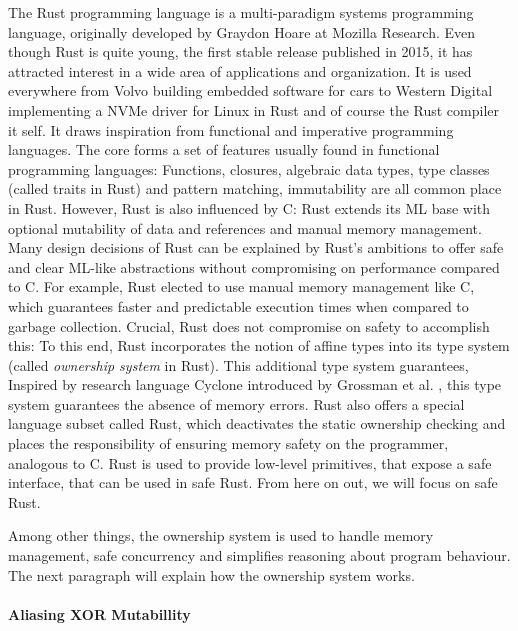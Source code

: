 \documentclass[twoside, english]{sdqthesis}
\theoremstyle{definition}
\begin{document}
The Rust programming language \cite{matsakis_rust_2014} is a multi-paradigm systems programming language, originally developed by Graydon Hoare at Mozilla Research.
Even though Rust is quite young, the first stable release published in 2015, it has attracted interest in a wide area of applications and organization. It is used everywhere from Volvo building embedded software for cars \cite{foufas_why_2022} to Western Digital implementing a NVMe driver for Linux in Rust \cite{larabel_lpc_2022} and of course the Rust compiler it self.
It draws inspiration from functional and imperative programming languages. The core forms a set of features usually found in functional programming languages: Functions, closures, algebraic data types, type classes (called traits in Rust) and pattern matching, immutability are all common place in Rust.
However, Rust is also influenced by C: Rust extends its ML base with optional mutability of data and references and manual memory management. Many design decisions of Rust can be explained by Rust's ambitions to offer safe and clear ML-like abstractions without compromising on performance compared to C.
For example, Rust elected to use manual memory management like C, which guarantees faster and predictable execution times when compared to garbage collection. Crucial, Rust does not compromise on safety to accomplish this: To this end, Rust incorporates the notion of affine types into its type system (called \textit{ownership system} in Rust). This additional type system guarantees, 
Inspired by research language Cyclone introduced by Grossman et al. \cite{grossman_region-based_nodate}, this type system guarantees the absence of memory errors.
Rust also offers a special language subset called  Rust, which deactivates the static ownership checking and places the responsibility of ensuring memory safety on the programmer, analogous to C.  Rust is used to provide low-level primitives, that expose a safe interface, that can be used in safe Rust. From here on out, we will focus on safe Rust.

Among other things, the ownership system is used to handle memory management, safe concurrency and simplifies reasoning about program behaviour.
The next paragraph will explain how the ownership system works.

\paragraph{Aliasing XOR Mutabillity}
\end{document}
